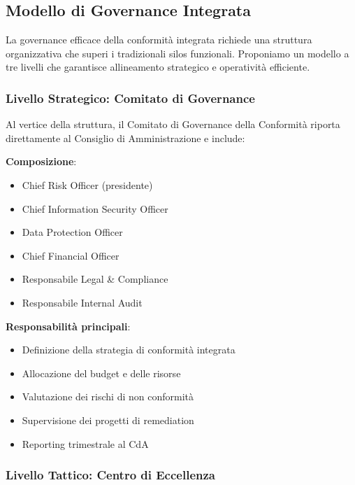 \subsection{\texorpdfstring{Modello di Governance Integrata}{4.6.1 - Modello di Governance Integrata}}
\label{subsec:4.6.1_governance}

La governance efficace della conformità integrata richiede una struttura organizzativa che superi i tradizionali silos funzionali. Proponiamo un modello a tre livelli che garantisce allineamento strategico e operatività efficiente.

\subsubsection{\texorpdfstring{Livello Strategico: Comitato di Governance}{4.6.1.1 - Livello Strategico: Comitato di Governance}}

Al vertice della struttura, il Comitato di Governance della Conformità riporta direttamente al Consiglio di Amministrazione e include:

\textbf{Composizione}:
\begin{itemize}
    \item Chief Risk Officer (presidente)
    \item Chief Information Security Officer
    \item Data Protection Officer
    \item Chief Financial Officer
    \item Responsabile Legal \& Compliance
    \item Responsabile Internal Audit
\end{itemize}

\textbf{Responsabilità principali}:
\begin{itemize}
    \item Definizione della strategia di conformità integrata
    \item Allocazione del budget e delle risorse
    \item Valutazione dei rischi di non conformità
    \item Supervisione dei progetti di remediation
    \item Reporting trimestrale al CdA
\end{itemize}

\subsubsection{\texorpdfstring{Livello Tattico: Centro di Eccellenza}{4.6.1.2 - Livello Tattico: Centro di Eccellenza}}

